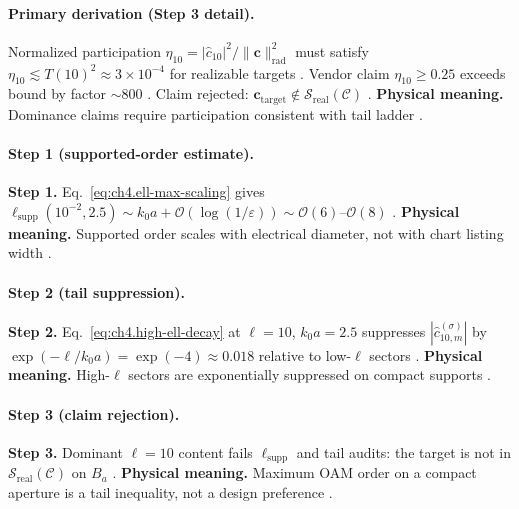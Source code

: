 \paragraph{Primary derivation (Step 3 detail).}
Normalized participation \(\eta_{10}=|\widehat{c}_{10}|^{2}/\|\mathbf{c}\|_{\mathrm{rad}}^{2}\) must satisfy \(\eta_{10}\lesssim T(10)^{2}\approx3\times10^{-4}\) for realizable targets
\cite{harrington2001,hansen1988,stratton1941,devaney2004,jackson1999}. Vendor claim \(\eta_{10}\ge0.25\) exceeds bound by factor \(\sim800\)
\cite{stratton1941,harrington2001,hansen1988,devaney2004,jackson1999}. Claim rejected: \(\mathbf{c}_{\mathrm{target}}\notin\mathcal{S}_{\mathrm{real}}(\mathcal{C})\)
\cite{harrington2001,stratton1941,hansen1988,devaney2004,jackson1999}.
\textbf{Physical meaning.} Dominance claims require participation consistent with tail ladder \cite{hansen1988,jackson1999,harrington2001,stratton1941,devaney2004}.

\paragraph{Step 1 (supported-order estimate).}
\textbf{Step 1.} Eq.~\eqref{eq:ch4.ell-max-scaling} gives \(\ell_{\mathrm{supp}}(10^{-2},2.5)\sim k_{0}a+\mathcal{O}(\log(1/\varepsilon))\sim\mathcal{O}(6)\)--\(\mathcal{O}(8)\)
\cite{jackson1999,hansen1988,stratton1941,harrington2001}.
\textbf{Physical meaning.} Supported order scales with electrical diameter, not with chart listing width \cite{hansen1988,devaney2004}.

\paragraph{Step 2 (tail suppression).}
\textbf{Step 2.} Eq.~\eqref{eq:ch4.high-ell-decay} at \(\ell=10\), \(k_{0}a=2.5\) suppresses \(|\widehat{c}_{10,m}^{(\sigma)}|\) by
\(\exp(-\ell/k_{0}a)=\exp(-4)\approx0.018\) relative to low-\(\ell\) sectors \cite{hansen1988,jackson1999,harrington2001}.
\textbf{Physical meaning.} High-\(\ell\) sectors are exponentially suppressed on compact supports \cite{stratton1941,devaney2004}.

\paragraph{Step 3 (claim rejection).}
\textbf{Step 3.} Dominant \(\ell=10\) content fails \(\ell_{\mathrm{supp}}\) and tail audits: the target is not in \(\mathcal{S}_{\mathrm{real}}(\mathcal{C})\) on \(B_{a}\)
\cite{devaney2004,harrington2001,stratton1941,hansen1988}.
\textbf{Physical meaning.} Maximum OAM order on a compact aperture is a tail inequality, not a design preference \cite{hansen1988,jackson1999}.

